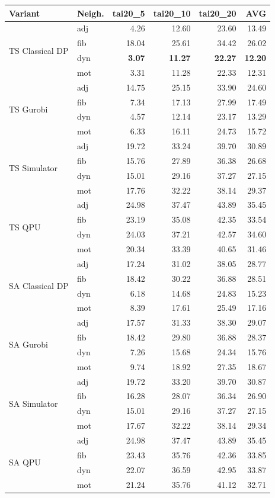 \setlength{\tabcolsep}{3pt}
\begin{tabular}{@{}ll rrrr@{}}
\textbf{Variant} & \textbf{Neigh.} & tai20\_5 & tai20\_10 & tai20\_20 & \textbf{AVG} \\
\hline
\multirow{4}{*}{TS Classical DP} & adj & 4.26 & 12.60 & 23.60 & 13.49 \\
 & fib & 18.04 & 25.61 & 34.42 & 26.02 \\
 & dyn & {\bfseries 3.07} & {\bfseries 11.27} & {\bfseries 22.27} & {\bfseries 12.20} \\
 & mot & 3.31 & 11.28 & 22.33 & 12.31 \\
\hline
\multirow{4}{*}{TS Gurobi} & adj & 14.75 & 25.15 & 33.90 & 24.60 \\
 & fib & 7.34 & 17.13 & 27.99 & 17.49 \\
 & dyn & 4.57 & 12.14 & 23.17 & 13.29 \\
 & mot & 6.33 & 16.11 & 24.73 & 15.72 \\
\hline
\multirow{4}{*}{TS Simulator} & adj & 19.72 & 33.24 & 39.70 & 30.89 \\
 & fib & 15.76 & 27.89 & 36.38 & 26.68 \\
 & dyn & 15.01 & 29.16 & 37.27 & 27.15 \\
 & mot & 17.76 & 32.22 & 38.14 & 29.37 \\
\hline
\multirow{4}{*}{TS QPU} & adj & 24.98 & 37.47 & 43.89 & 35.45 \\
 & fib & 23.19 & 35.08 & 42.35 & 33.54 \\
 & dyn & 24.03 & 37.21 & 42.57 & 34.60 \\
 & mot & 20.34 & 33.39 & 40.65 & 31.46 \\
\hline
\multirow{4}{*}{SA Classical DP} & adj & 17.24 & 31.02 & 38.05 & 28.77 \\
 & fib & 18.42 & 30.22 & 36.88 & 28.51 \\
 & dyn & 6.18 & 14.68 & 24.83 & 15.23 \\
 & mot & 8.39 & 17.61 & 25.49 & 17.16 \\
\hline
\multirow{4}{*}{SA Gurobi} & adj & 17.57 & 31.33 & 38.30 & 29.07 \\
 & fib & 18.42 & 29.80 & 36.88 & 28.37 \\
 & dyn & 7.26 & 15.68 & 24.34 & 15.76 \\
 & mot & 9.74 & 18.92 & 27.35 & 18.67 \\
\hline
\multirow{4}{*}{SA Simulator} & adj & 19.72 & 33.20 & 39.70 & 30.87 \\
 & fib & 16.28 & 28.07 & 36.34 & 26.90 \\
 & dyn & 15.01 & 29.16 & 37.27 & 27.15 \\
 & mot & 17.67 & 32.22 & 38.14 & 29.34 \\
\hline
\multirow{4}{*}{SA QPU} & adj & 24.98 & 37.47 & 43.89 & 35.45 \\
 & fib & 23.43 & 35.76 & 42.36 & 33.85 \\
 & dyn & 22.07 & 36.59 & 42.95 & 33.87 \\
 & mot & 21.24 & 35.76 & 41.12 & 32.71 \\
\hline
\end{tabular}
